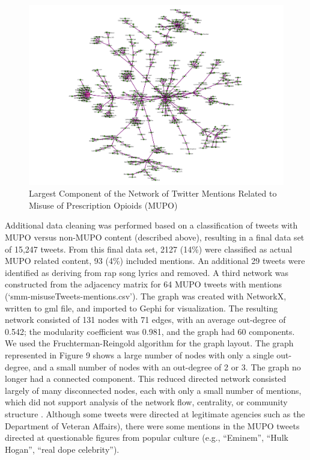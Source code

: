 \documentclass[sigconf]{acmart}
\begin{document}
\begin{figure}[!ht]
  \centering\includegraphics[width=\columnwidth]{images/Figure8.pdf}
  \caption{Largest Component of the Network of Twitter Mentions Related to 
  Misuse of Prescription Opioids (MUPO)}
  \label{f:Figure8}
\end{figure}

Additional data cleaning was performed based on a classification of tweets
with MUPO versus non-MUPO content (described above), resulting in a final data 
set of 15,247 tweets. From this final data set, 2127 (14\%) were classified as 
actual MUPO related content, 93 (4\%) included mentions. An additional 29 
tweets were identified as deriving from rap song lyrics and removed. A third 
network was constructed from the adjacency matrix for 64 MUPO tweets with 
mentions (`smm-misuseTweets-mentions.csv'). The graph was created with NetworkX,
written to gml file, and imported to Gephi for visualization. The resulting 
network consisted of 131 nodes with 71 edges, with an average out-degree of 0.542; 
the modularity coefficient was 0.981, and the graph had 60 components. We used
the Fruchterman-Reingold algorithm for the graph layout. The graph represented 
in Figure 9 shows a large number of nodes with only a single out-degree, and a 
small number of nodes with an out-degree of 2 or 3. The graph no longer had a 
connected component. This reduced directed network consisted largely of many 
disconnected nodes, each with only a small number of mentions, which did not
support analysis of the network flow, centrality, or community structure 
\cite{golbeck13, zafarani14}. Although some tweets were directed at legitimate 
agencies such as the Department of Veteran Affairs), there were some mentions 
in the MUPO tweets directed at questionable figures from popular culture 
(e.g., ``Eminem'', ``Hulk Hogan'', ``real dope celebrity''). 
\end{document}
